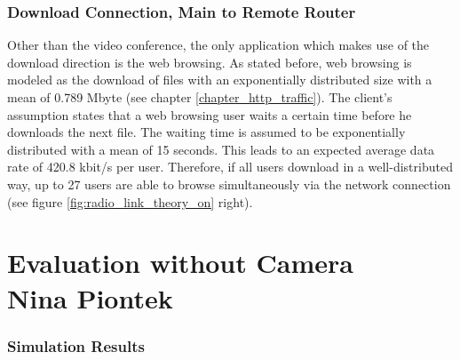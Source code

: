 \documentclass[a4paper,10pt]{book}\usepackage{graphicx}
\begin{document}
\subsection{Download Connection, Main to Remote Router}
Other than the video conference, the only application which makes use of the download direction is the web browsing. As stated before, web browsing is modeled as the download of files with an exponentially distributed size with a mean of 0.789 Mbyte (see chapter \ref{chapter_http_traffic}). The client's assumption states that a web browsing user waits a certain time before he downloads the next file. The waiting time is assumed to be exponentially distributed with a mean of 15 seconds. This leads to an expected average data rate of 420.8 kbit/s per user. Therefore, if all users download in a well-distributed way, up to 27 users are able to browse simultaneously via the network connection (see figure \ref{fig:radio_link_theory_on} right).

\chapter{Evaluation without Camera \\ {\large Nina Piontek}}

\subsection{Simulation Results}
\end{document}
